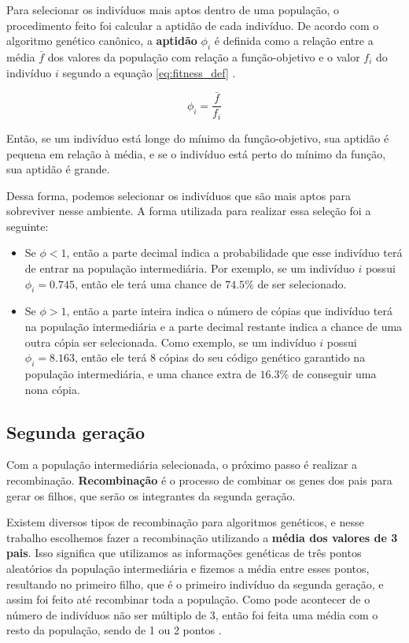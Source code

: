 Para selecionar os indivíduos mais aptos dentro de uma população, o procedimento feito foi calcular a aptidão de cada indivíduo. De acordo com o algoritmo genético canônico, a \textbf{aptidão} $ \phi_i $ é definida como a relação entre a média $ \bar{f} $ dos valores da população com relação a função-objetivo e o valor $ f_i $ do indivíduo $ i $ segundo a equação \ref{eq:fitness_def} \cite{whitleyGAtutorial}.

\begin{equation}
\phi_i = \dfrac{\bar{f}}{f_i}
\label{eq:fitness_def}
\end{equation}

Então, se um indivíduo está longe do mínimo da função-objetivo, sua aptidão é pequena em relação à média, e se o indivíduo está perto do mínimo da função, sua aptidão é grande. 

Dessa forma, podemos selecionar os indivíduos que são mais aptos para sobreviver nesse ambiente. A forma utilizada para realizar essa seleção foi a seguinte:

\begin{itemize}
	\item Se $ \phi < 1 $, então a parte decimal indica a probabilidade que esse indivíduo terá de entrar na população intermediária. Por exemplo, se um indivíduo $ i $ possui $ \phi_i = 0.745 $, então ele terá uma chance de $ 74.5\% $ de ser selecionado.
	\item Se $ \phi > 1 $, então a parte inteira indica o número de cópias que indivíduo terá na população intermediária e a parte decimal restante indica a chance de uma outra cópia ser selecionada. Como exemplo, se um indivíduo $ i $ possui $ \phi_i = 8.163 $, então ele terá 8 cópias do seu código genético garantido na população intermediária, e uma chance extra de $ 16.3\% $ de conseguir uma nona cópia.
\end{itemize}

\subsection{Segunda geração}

Com a população intermediária selecionada, o próximo passo é realizar a recombinação. \textbf{Recombinação} é o processo de combinar os genes dos pais para gerar os filhos, que serão os integrantes da segunda geração. 

Existem diversos tipos de recombinação para algoritmos genéticos, e nesse trabalho escolhemos fazer a recombinação utilizando a \textbf{média dos valores de 3 pais}. Isso significa que utilizamos as informações genéticas de três pontos aleatórios da população intermediária e fizemos a média entre esses pontos, resultando no primeiro filho, que é o primeiro indivíduo da segunda geração, e assim foi feito até recombinar toda a população. Como pode acontecer de o número de indivíduos não ser múltiplo de 3, então foi feita uma média com o resto da população, sendo de 1 ou 2 pontos \cite{Ting2005}. 

